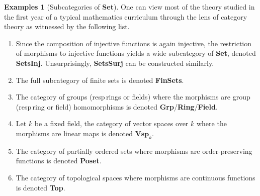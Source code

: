 \documentclass{article}
\theoremstyle{definition}
\newtheorem{exmps}[thm]{Examples}
\theoremstyle{remark}
\begin{document}
\begin{exmps}[Subcategories of \textbf{Set}]
	One can view most of the theory studied in the first year of a typical mathematics curriculum through the lens of category theory as witnessed by the following list.
	\begin{enumerate}
		\item Since the composition of injective functions is again injective, the restriction of morphisms to injective functions yields a wide subcategory of \textbf{Set}, denoted \textbf{SetsInj}. Unsurprisingly, \textbf{SetsSurj} can be constructed similarly.
		\item The full subcategory of finite sets is denoted \textbf{FinSets}.
		\item The category of groups (resp\,rings or fields) where the morphisms are group (resp\,ring or field) homomorphisms is denoted \textbf{Grp}/\textbf{Ring}/\textbf{Field}.
		\item Let $k$ be a fixed field, the category of vector spaces over $k$ where the morphisms are linear maps is denoted $\textbf{Vsp}_k$.
		\item The category of partially ordered sets where morphisms are order-preserving functions is denoted \textbf{Poset}.
		\item The category of topological spaces where morphisms are continuous functions is denoted \textbf{Top}.
	\end{enumerate}
\end{exmps}
\end{document}

